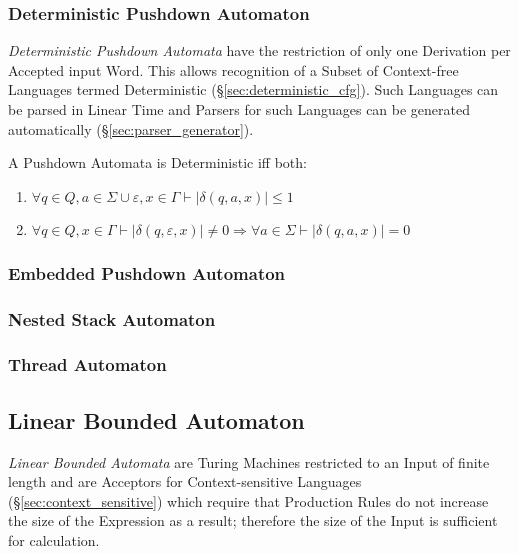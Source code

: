 \subsubsection{Deterministic Pushdown Automaton}
\label{sec:deterministic_pda}

\emph{Deterministic Pushdown Automata} have the restriction of only
one Derivation per Accepted input Word. This allows recognition of a
Subset of Context-free Languages termed Deterministic
(\S\ref{sec:deterministic_cfg}). Such Languages can be parsed in
Linear Time and Parsers for such Languages can be generated
automatically (\S\ref{sec:parser_generator}).

A Pushdown Automata is Deterministic iff both:
\begin{enumerate}
\item $\forall q \in Q, a \in \Sigma \cup {\varepsilon}, x \in
  \Gamma \vdash |\delta(q,a,x)| \leq 1$
\item $\forall q \in Q, x \in \Gamma \vdash |\delta(q,\varepsilon,x)|
  \neq 0 \Rightarrow \forall a \in \Sigma \vdash |\delta(q,a,x)|=0$
\end{enumerate}



\subsubsection{Embedded Pushdown Automaton}\label{sec:embedded_pushdown}

\subsubsection{Nested Stack Automaton}\label{sec:nested_stack_automaton}

\subsubsection{Thread Automaton}\label{sec:thread_automaton}



\subsection{Linear Bounded Automaton} \label{sec:linear_bounded_automaton}

\emph{Linear Bounded Automata} are Turing Machines restricted to an
Input of finite length and are Acceptors for Context-sensitive
Languages (\S\ref{sec:context_sensitive}) which require that
Production Rules do not increase the size of the Expression as a
result; therefore the size of the Input is sufficient for calculation.



